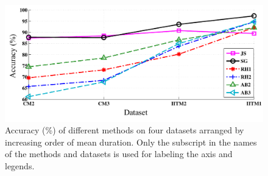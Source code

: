 {\begin{figure}
	\begin{center}
		\includegraphics[width=\figSizeNinety]{ch05_preprocessing/figures/Accuracy_Length.pdf}
	\end{center}
	\caption[Tonic identification accuracies of different approaches on four datasets]{Accuracy (\%) of different methods on four datasets arranged by increasing order of mean duration. Only the subscript in the names of the methods and datasets is used for labeling the axis and legends.}
	\label{fig:tonic_id_accuracy_vs_length}
\end{figure}


}
